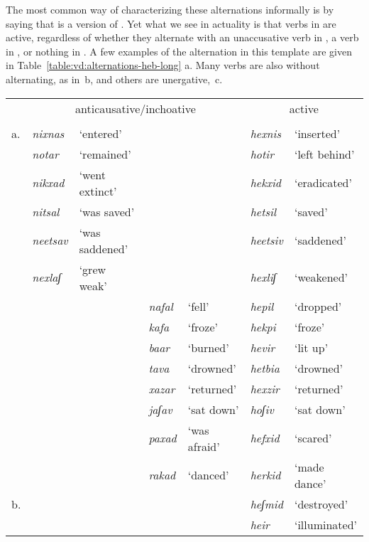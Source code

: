 \begin{exe}
\begin{xlist}
\begin{xlist}
\begin{exe}
The most common way of characterizing these alternations informally is by saying that {\thif} is a  version of {\tkal}. Yet what we see in actuality is that verbs in {\thif} are active, regardless of whether they alternate with an unaccusative verb in {\tkal}, a  verb in {\tkal}, or nothing in {\tkal}. A few examples of the  alternation in this template are given in Table~\ref{table:vd:alternations-heb-long} a. Many verbs are also  without alternating, as in~b, and others are unergative,~c.
\begin{table}
	\begin{tabularx}{\textwidth}{lllllll}
 \lsptoprule
	& \multicolumn{4}{c}{anticausative/inchoative} & \multicolumn{2}{c}{active}\\
	& \multicolumn{2}{c}{\tnif}	&	\multicolumn{2}{c}{\tkal}	& \multicolumn{2}{c}{\thif}\\\midrule
	a.& \emph{nixnas} & `entered' & && \emph{hexnis} & `inserted'\\
	 & \emph{notar} & `remained' & && \emph{hotir} & `left behind'\\
	 & \emph{nikxad} & `went extinct' & && \emph{hekxid} & `eradicated'\\
	 & \emph{ni{ts}al} & `was saved' & && \emph{he{ts}il} & `saved'\\
	 & \emph{nee{ts}av} & `was saddened' & && \emph{hee{ts}iv} & `saddened'\\
	 & \emph{nexlaʃ} & `grew weak' & && \emph{hexliʃ} & `weakened'\\\tablevspace
	 & && \emph{nafal} & `fell' & \emph{hepil} & `dropped'\\
	 & && \emph{kafa} & `froze' & \emph{hekpi} & `froze'\\
	 & && \emph{baar} & `burned' & \emph{hevir} & `lit up'\\
	 & && \emph{tava} & `drowned' & \emph{hetbia} & `drowned'\\\tablevspace
	 & && \emph{xazar} & `returned' & \emph{hexzir} & `returned'\\
	 & && \emph{jaʃav} & `sat down' & \emph{hoʃiv} & `sat down'\\
	 & && \emph{paxad} & `was afraid' & \emph{hefxid} & `scared'\\
	 & && \emph{rakad} & `danced' & \emph{herkid} & `made dance'\\
	 \tablevspace
	b.& &&&& \emph{heʃmid} & `destroyed' \\
	& &&&& \emph{heir} & `illuminated'\\

\end{tabularx}
\end{table}
\end{exe}
\end{xlist}
\end{xlist}
\end{exe}
